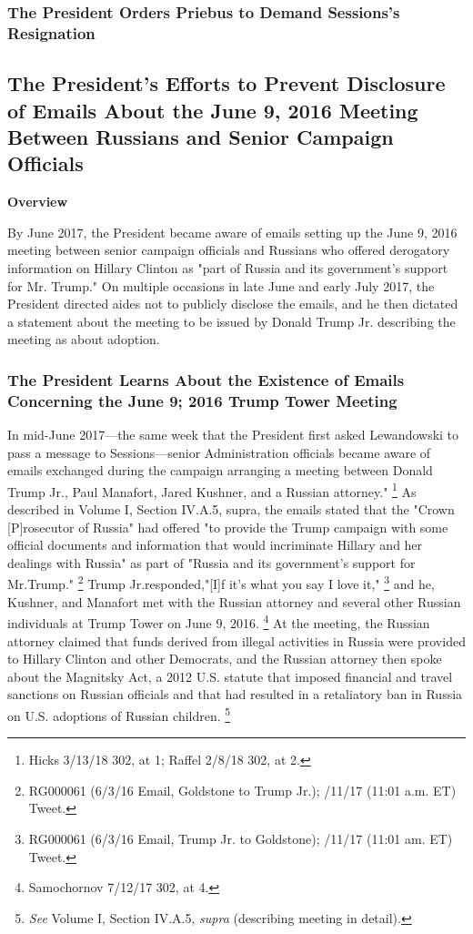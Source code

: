 \subsubsection{The President Orders Priebus to Demand Sessions's Resignation}

\subsection{The President's Efforts to Prevent Disclosure of Emails About the June 9, 2016 Meeting Between Russians and Senior Campaign Officials}

\begin{center}
\textbf{Overview}
\end{center}

By June 2017, the President became aware of emails setting up the June 9, 2016 meeting between senior campaign officials and Russians who offered derogatory information on Hillary Clinton as "part of Russia and its government's support for Mr. Trump."
On multiple occasions in late June and early July 2017, the President directed aides not to publicly disclose the emails, and he then dictated a statement about the meeting to be issued by Donald Trump Jr. describing the meeting as about adoption.

\subsubsection{The President Learns About the Existence of Emails Concerning the June 9; 2016 Trump Tower Meeting}

In mid-June 2017—the same week that the President first asked Lewandowski to pass a message to Sessions—senior Administration officials became aware of emails exchanged during the campaign arranging a meeting between Donald Trump Jr., Paul Manafort, Jared Kushner, and a Russian attorney."%
\footnote{Hicks 3/13/18 302, at 1;
Raffel 2/8/18 302, at 2.}
As described in Volume I, Section IV.A.5, supra, the emails stated that the "Crown [P]rosecutor of Russia" had offered "to provide the Trump campaign with some official documents and information that would incriminate Hillary and her dealings with Russia" as part of "Russia and its government's support for Mr.Trump."%
\footnote{RG000061 (6/3/16 Email, Goldstone to Trump Jr.);
/11/17 (11:01 a.m. ET) Tweet.}
Trump Jr.responded,"[I]f it's what you say I love it,"%
\footnote{RG000061 (6/3/16 Email, Trump Jr. to Goldstone);
/11/17 (11:01 am. ET) Tweet.}
and he, Kushner, and Manafort met with the Russian attorney and several other Russian individuals at Trump Tower on June 9, 2016.%
\footnote{Samochornov 7/12/17 302, at 4.}
At the meeting, the Russian attorney claimed that funds derived from illegal activities in Russia were provided to Hillary Clinton and other Democrats, and the Russian attorney then spoke about the Magnitsky Act, a 2012 U.S. statute that imposed financial and travel sanctions on Russian officials and that had resulted in a retaliatory ban in Russia on U.S. adoptions of Russian children.%
\footnote{\textit{See} Volume I, Section IV.A.5, \textit{supra} (describing meeting in detail).}

